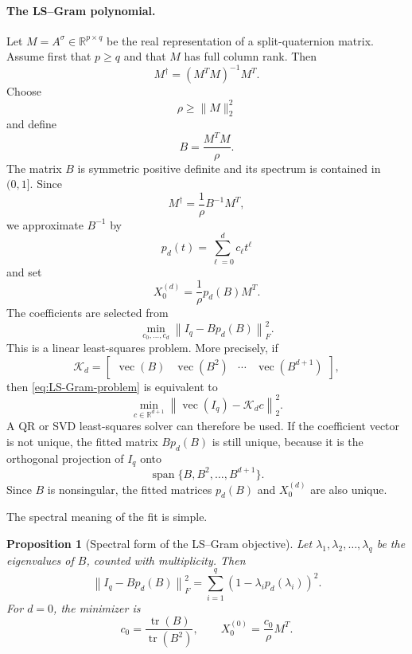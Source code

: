 \documentclass[12pt,a4paper]{article}
\theoremstyle{plain}
\newtheorem{proposition}[theorem]{Proposition}
\theoremstyle{definition}
\theoremstyle{remark}
\begin{document}
\paragraph{The LS--Gram polynomial.}
Let $M=A^\sigma\in\mathbb{R}^{p\times q}$
be the real representation of a split-quaternion matrix.  Assume first that $p\ge q$ and that $M$ has full column rank.  Then
\[
    M^\dagger=(M^TM)^{-1}M^T.
\]
Choose
\[
    \rho\geq\|M\|_2^2
\]
and define
\begin{equation}\label{eq:normalized-column-gram}
    B=\frac{M^TM}{\rho}.
\end{equation}
The matrix $B$ is symmetric positive definite and its spectrum is contained in $(0,1]$.  Since
\[
    M^\dagger=\frac{1}{\rho}B^{-1}M^T,
\]
we approximate $B^{-1}$ by
\[
    p_d(t)=\sum_{\ell=0}^{d}c_\ell t^\ell
\]
and set
\begin{equation}\label{eq:LS-Gram-column-init}
    X_0^{(d)} = \frac{1}{\rho}p_d(B)M^T.
\end{equation}
The coefficients are selected from
\begin{equation}\label{eq:LS-Gram-problem}
    \min_{c_0,\ldots,c_d} \left\|I_q-Bp_d(B)\right\|_F^2.
\end{equation}
This is a linear least-squares problem.  More precisely, if
\[
    \mathcal{K}_d = 
    \begin{bmatrix}
    \operatorname{vec}(B)&
    \operatorname{vec}(B^2)&
    \cdots&
    \operatorname{vec}(B^{d+1})
    \end{bmatrix},
\]
then \eqref{eq:LS-Gram-problem} is equivalent to
\begin{equation}\label{eq:vectorized-LS-Gram}
    \min_{c\in\mathbb{R}^{d+1}} \left\| \operatorname{vec}(I_q)-\mathcal{K}_dc \right\|_2^2.
\end{equation}
A QR or SVD least-squares solver can therefore be used.  If the coefficient vector is not unique, the fitted matrix $Bp_d(B)$ is still unique, because it is the orthogonal projection of $I_q$ onto
\[
    \operatorname{span}\{B,B^2,\ldots,B^{d+1}\}.
\]
Since $B$ is nonsingular, the fitted matrices $p_d(B)$ and $X_0^{(d)}$ are also unique.

The spectral meaning of the fit is simple.

\begin{proposition}[Spectral form of the LS--Gram objective]\label{prop:LS-Gram-spectral}
Let $\lambda_1,\lambda_2,\ldots,\lambda_q$ be the eigenvalues of $B$, counted with multiplicity.  Then
\begin{equation} \label{eq:spectral-LS-Gram}
    \left\|I_q-Bp_d(B)\right\|_F^2 = \sum_{i=1}^{q} \left(1-\lambda_i p_d(\lambda_i)\right)^2.
\end{equation}
For $d=0$, the minimizer is
\begin{equation}\label{eq:degree-zero-LS-scaling}
    c_0 = \frac{\operatorname{tr}(B)}{\operatorname{tr}(B^2)}, \qquad X_0^{(0)}=\frac{c_0}{\rho}M^T.
\end{equation}
\end{proposition}
\end{document}
